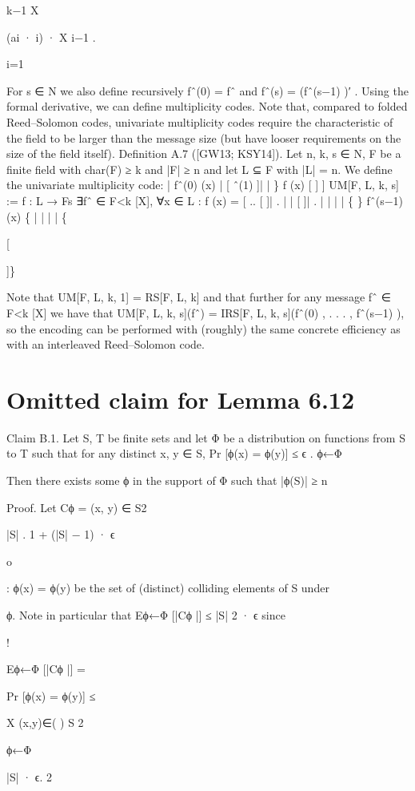 \documentclass[11pt]{article}
\begin{document}
k−1
X

(ai · i) · X i−1 .

i=1

For s ∈ N we also define recursively fˆ(0) = fˆ and fˆ(s) = (fˆ(s−1) )′ .
Using the formal derivative, we can define multiplicity codes. Note that, compared to folded
Reed–Solomon codes, univariate multiplicity codes require the characteristic of the field to be larger
than the message size (but have looser requirements on the size of the field itself).
Definition A.7 ([GW13; KSY14]). Let n, k, s ∈ N, F be a finite field with char(F) ≥ k and |F| ≥ n
and let L ⊆ F with |L| = n. We define the univariate multiplicity code:
|
fˆ(0) (x)
|
[ ˆ(1)
]|
|
\}
f
(x)
[
]
]
UM[F, L, k, s] := f : L → Fs ∃fˆ ∈ F<k [X], ∀x ∈ L : f (x) = [
..
[
]| .
|
|
[
]|
.
|
|
|
|
\{
\}
fˆ(s−1) (x)
\{
|
|
|
|
\{

[


]\}

Note that UM[F, L, k, 1] = RS[F, L, k] and that further for any message fˆ ∈ F<k [X] we have that
UM[F, L, k, s](fˆ) = IRS[F, L, k, s](fˆ(0) , . . . , fˆ(s−1) ), so the encoding can be performed with (roughly)
the same concrete efficiency as with an interleaved Reed–Solomon code.


\section{Omitted claim for Lemma 6.12}



Claim B.1. Let S, T be finite sets and let Φ be a distribution on functions from S to T such that
for any distinct x, y ∈ S,
Pr [ϕ(x) = ϕ(y)] ≤ ϵ .
ϕ←Φ

Then there exists some ϕ in the support of Φ such that
|ϕ(S)| ≥
n

Proof. Let Cϕ = (x, y) ∈ S2



|S|
.
1 + (|S| − 1) · ϵ

o

: ϕ(x) = ϕ(y) be the set of (distinct) colliding elements of S under

ϕ. Note in particular that Eϕ←Φ [|Cϕ |] ≤ |S|
2 · ϵ since


!

Eϕ←Φ [|Cϕ |] =

Pr [ϕ(x) = ϕ(y)] ≤

X
(x,y)∈( )
S
2

ϕ←Φ

|S|
· ϵ.
2
\end{document}
